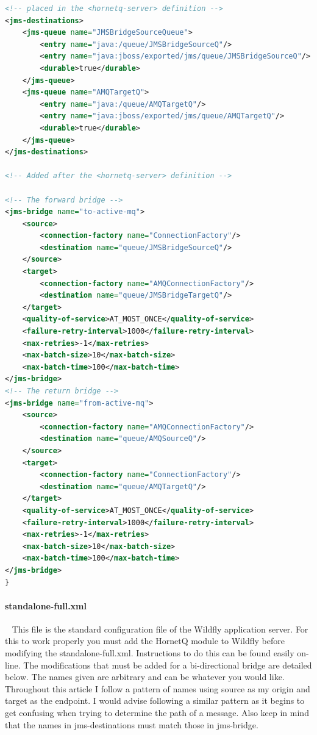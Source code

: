 \documentclass[
10pt, %
letterpaper, %
oneside, %
headinclude,footinclude, %
BCOR5mm, %
]{scrartcl}
\begin{document}
\begin{lstlisting}[language=XML]
<!-- placed in the <hornetq-server> definition -->
<jms-destinations>
	<jms-queue name="JMSBridgeSourceQueue">
		<entry name="java:/queue/JMSBridgeSourceQ"/>
		<entry name="java:jboss/exported/jms/queue/JMSBridgeSourceQ"/>
		<durable>true</durable>
	</jms-queue>
	<jms-queue name="AMQTargetQ">
		<entry name="java:/queue/AMQTargetQ"/>
		<entry name="java:jboss/exported/jms/queue/AMQTargetQ"/>
		<durable>true</durable>
	</jms-queue>
</jms-destinations>

<!-- Added after the <hornetq-server> definition -->

<!-- The forward bridge -->
<jms-bridge name="to-active-mq">
	<source>
		<connection-factory name="ConnectionFactory"/>
		<destination name="queue/JMSBridgeSourceQ"/>
	</source>
	<target>
		<connection-factory name="AMQConnectionFactory"/>
		<destination name="queue/JMSBridgeTargetQ"/>
	</target>
	<quality-of-service>AT_MOST_ONCE</quality-of-service>
	<failure-retry-interval>1000</failure-retry-interval>
	<max-retries>-1</max-retries>
	<max-batch-size>10</max-batch-size>
	<max-batch-time>100</max-batch-time>
</jms-bridge>
<!-- The return bridge -->
<jms-bridge name="from-active-mq">
	<source>
		<connection-factory name="AMQConnectionFactory"/>
		<destination name="queue/AMQSourceQ"/>
	</source>
	<target>
		<connection-factory name="ConnectionFactory"/>
		<destination name="queue/AMQTargetQ"/>
	</target>
	<quality-of-service>AT_MOST_ONCE</quality-of-service>
	<failure-retry-interval>1000</failure-retry-interval>
	<max-retries>-1</max-retries>
	<max-batch-size>10</max-batch-size>
	<max-batch-time>100</max-batch-time>
</jms-bridge>
}
\end{lstlisting}

\paragraph{standalone-full.xml} ~\newline\newline
This file is the standard configuration file of the Wildfly application server. For this to work properly you must add the HornetQ module to Wildfly before modifying the standalone-full.xml. Instructions to do this can be found easily on-line. The modifications that must be added for a bi-directional bridge are detailed below. The names given are arbitrary and can be whatever you would like. Throughout this article I follow a pattern of names using source as my origin and target as the endpoint. I would advise following a similar pattern as it begins to get confusing when trying to determine the path of a message. Also keep in mind that the names in jms-destinations must match those in jms-bridge.\newline
\end{document}
